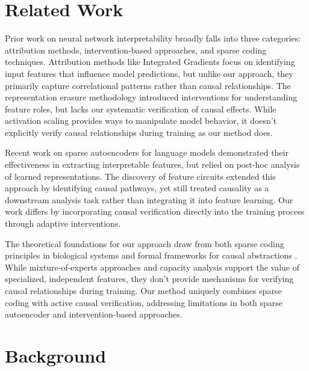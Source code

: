 \documentclass{article} %
\begin{document}
\section{Related Work}
\label{sec:related}

Prior work on neural network interpretability broadly falls into three categories: attribution methods, intervention-based approaches, and sparse coding techniques. Attribution methods like Integrated Gradients \cite{Sundararajan2017AxiomaticAF} focus on identifying input features that influence model predictions, but unlike our approach, they primarily capture correlational patterns rather than causal relationships. The representation erasure methodology \cite{Li2016UnderstandingNN} introduced interventions for understanding feature roles, but lacks our systematic verification of causal effects. While activation scaling \cite{Stoehr2024ActivationSF} provides ways to manipulate model behavior, it doesn't explicitly verify causal relationships during training as our method does.

Recent work on sparse autoencoders for language models \cite{Cunningham2023SparseAF} demonstrated their effectiveness in extracting interpretable features, but relied on post-hoc analysis of learned representations. The discovery of feature circuits \cite{Marks2024SparseFC} extended this approach by identifying causal pathways, yet still treated causality as a downstream analysis task rather than integrating it into feature learning. Our work differs by incorporating causal verification directly into the training process through adaptive interventions.

The theoretical foundations for our approach draw from both sparse coding principles in biological systems \cite{Olshausen1996EmergenceOS, Bricken2023EmergenceOS} and formal frameworks for causal abstractions \cite{Geiger2021CausalAO}. While mixture-of-experts approaches \cite{Park2024MonetMO} and capacity analysis \cite{Scherlis2022PolysemanticityAC} support the value of specialized, independent features, they don't provide mechanisms for verifying causal relationships during training. Our method uniquely combines sparse coding with active causal verification, addressing limitations in both sparse autoencoder and intervention-based approaches.

\section{Background}
\label{sec:background}
\end{document}
